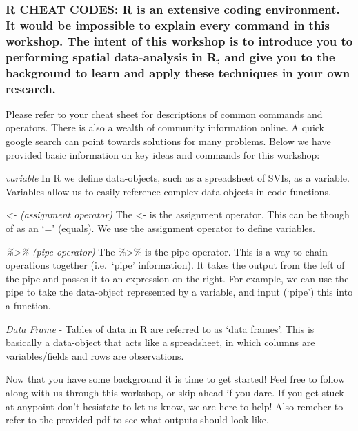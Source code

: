 \documentclass[
  12pt,
]{article}
\begin{document}
\hypertarget{r-cheat-codes-r-is-an-extensive-coding-environment.-it-would-be-impossible-to-explain-every-command-in-this-workshop.-the-intent-of-this-workshop-is-to-introduce-you-to-performing-spatial-data-analysis-in-r-and-give-you-to-the-background-to-learn-and-apply-these-techniques-in-your-own-research.}{%
\subsubsection{R CHEAT CODES: R is an extensive coding environment. It
would be impossible to explain every command in this workshop. The
intent of this workshop is to introduce you to performing spatial
data-analysis in R, and give you to the background to learn and apply
these techniques in your own
research.}\label{r-cheat-codes-r-is-an-extensive-coding-environment.-it-would-be-impossible-to-explain-every-command-in-this-workshop.-the-intent-of-this-workshop-is-to-introduce-you-to-performing-spatial-data-analysis-in-r-and-give-you-to-the-background-to-learn-and-apply-these-techniques-in-your-own-research.}}

Please refer to your cheat sheet for descriptions of common commands and
operators. There is also a wealth of community information online. A
quick google search can point towards solutions for many problems. Below
we have provided basic information on key ideas and commands for this
workshop:

\emph{variable} In R we define data-objects, such as a spreadsheet of
SVIs, as a variable. Variables allow us to easily reference complex
data-objects in code functions.

\emph{\textless- (assignment operator)} The \textless- is the assignment
operator. This can be though of as an `=' (equals). We use the
assignment operator to define variables.

\emph{\%\textgreater\% (pipe operator)} The \%\textgreater\% is the pipe
operator. This is a way to chain operations together (i.e.~`pipe'
information). It takes the output from the left of the pipe and passes
it to an expression on the right. For example, we can use the pipe to
take the data-object represented by a variable, and input (`pipe') this
into a function.

\emph{Data Frame} - Tables of data in R are referred to as `data
frames'. This is basically a data-object that acts like a spreadsheet,
in which columns are variables/fields and rows are observations.

Now that you have some background it is time to get started! Feel free
to follow along with us through this workshop, or skip ahead if you
dare. If you get stuck at anypoint don't hesistate to let us know, we
are here to help! Also remeber to refer to the provided pdf to see what
outputs should look like.
\end{document}
